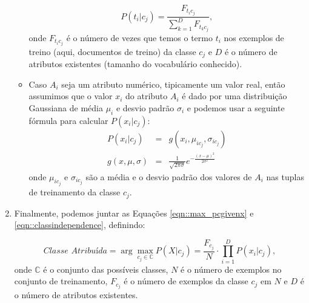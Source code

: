 \begin{enumerate}
\begin{itemize}
    \begin{equation}\label{eqn::nbcattexto}
        P(t_i|c_j) = \frac{ F_{t_{i}c_{j}} }{ \sum\limits^{D}_{k = 1} { } F_{t_{k}c_{j}} },
    \end{equation}
        onde $F_{t_{i}c_{j}}$ é o número de vezes que temos o termo $t_i$ nos exemplos de treino (aqui, documentos de treino) da classe $c_j$ e $D$ é o número de atributos existentes (tamanho do vocabulário conhecido).

        \item Caso $A_i$ seja um atributo numérico, tipicamente um valor real, então assumimos que o valor $x_i$ do atributo $A_i$ é dado por uma distribuição Gaussiana de média $\mu_i$ e desvio padrão $\sigma_i$ e podemos usar a seguinte fórmula para calcular $P(x_i|c_j)$:
    \begin{eqnarray}\label{eqn::nbnumerico}
        P(x_i|c_j) & = & g(x_i, \mu_{ic_j}, \sigma_{ic_j})  \\
        g(x, \mu, \sigma) & = & \frac {1} { \sqrt{2\pi\sigma} } e^{ -\frac{(x-\mu)^2}{2\sigma^2}  } 
    \end{eqnarray}
        onde $\mu_{ic_j}$ e $\sigma_{ic_j}$ são a média e o desvio padrão dos valores de $A_i$ nas tuplas de treinamento da classe $c_j$. 

    \end{itemize}

    \item Finalmente, podemos juntar as Equações \ref{eqn::max_pcgivenx} e \ref{eqn::classindependence}, definindo:

    \begin{equation}\label{eqn::nbfinal}
    \textit{Classe Atribuída} = \arg\max_{c_j \in \mathbb{C}}P(X|c_j) = \frac{F_{c_j}}{N} \cdot {\prod^{D}_{i=1}{P(x_i|c_j) }},
    \end{equation}
    onde $\mathbb{C}$ é o conjunto das possíveis classes, $N$ é o número de exemplos no conjunto de treinamento, $F_{c_j}$ é o número de exemplos da classe $c_j$ em $N$ e $D$ é o número de atributos existentes.


\end{enumerate}


